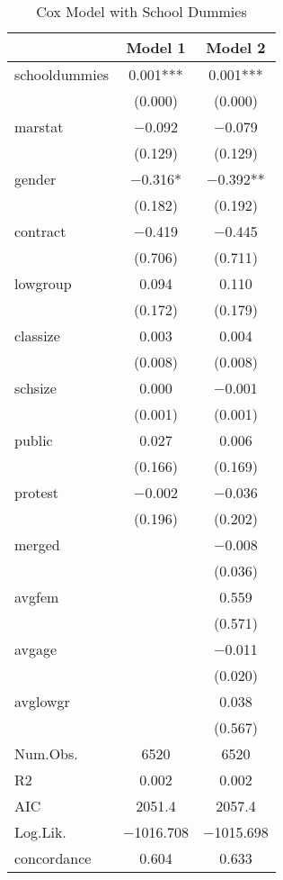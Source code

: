 \documentclass[
]{article}
\begin{document}
\begin{table}[!h]

\caption{\label{tab:unnamed-chunk-26}Cox Model with School Dummies}
\centering
\fontsize{8}{10}\selectfont
\begin{tabular}[t]{lcc}
\toprule
  & Model 1 & Model 2\\
\midrule
schooldummies & \num{0.001}*** & \num{0.001}***\\
 & (\num{0.000}) & (\num{0.000})\\
marstat & \num{-0.092} & \num{-0.079}\\
 & (\num{0.129}) & (\num{0.129})\\
gender & \num{-0.316}* & \num{-0.392}**\\
 & (\num{0.182}) & (\num{0.192})\\
contract & \num{-0.419} & \num{-0.445}\\
 & (\num{0.706}) & (\num{0.711})\\
lowgroup & \num{0.094} & \num{0.110}\\
 & (\num{0.172}) & (\num{0.179})\\
classize & \num{0.003} & \num{0.004}\\
 & (\num{0.008}) & (\num{0.008})\\
schsize & \num{0.000} & \num{-0.001}\\
 & (\num{0.001}) & (\num{0.001})\\
public & \num{0.027} & \num{0.006}\\
 & (\num{0.166}) & (\num{0.169})\\
protest & \num{-0.002} & \num{-0.036}\\
 & (\num{0.196}) & (\num{0.202})\\
merged &  & \num{-0.008}\\
 &  & (\num{0.036})\\
avgfem &  & \num{0.559}\\
 &  & (\num{0.571})\\
avgage &  & \num{-0.011}\\
 &  & (\num{0.020})\\
avglowgr &  & \num{0.038}\\
 &  & (\num{0.567})\\
\midrule
Num.Obs. & \num{6520} & \num{6520}\\
R2 & \num{0.002} & \num{0.002}\\
AIC & \num{2051.4} & \num{2057.4}\\
Log.Lik. & \num{-1016.708} & \num{-1015.698}\\
concordance & \num{0.604} & \num{0.633}\\

\end{tabular}
\end{table}
\end{document}
